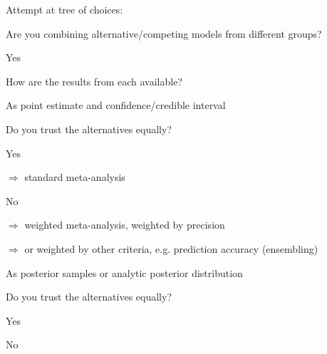 \documentclass{article}
\begin{document}
Attempt at tree of choices:
\begin{tree}
    \item Are you combining alternative/competing models from different groups?
    \begin{tree}
        \item Yes
        \begin{tree}
            \item How are the results from each available?
            \begin{tree}
                \item As point estimate and confidence/credible interval
                \begin{tree}
                    \item Do you trust the alternatives equally?
                    \begin{tree}
                        \item Yes
                        \begin{tree}
                            \item $\Rightarrow$ standard meta-analysis
                        \end{tree}
                        \item No
                        \begin{tree}
                            \item $\Rightarrow$ weighted meta-analysis, weighted by precision
                            \item $\Rightarrow$ or weighted by other criteria, e.g. prediction accuracy (ensembling)
                        \end{tree}
                    \end{tree}
                \end{tree}
                \item As posterior samples or analytic posterior distribution
                \begin{tree}
                    \item Do you trust the alternatives equally?
                    \begin{tree}
                        \item Yes
                        \item No
                    \end{tree}
                \end{tree}
            \end{tree}

\end{tree}
\end{tree}
\end{tree}
\end{document}
